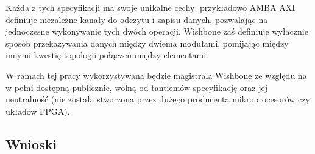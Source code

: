 Każda z tych specyfikacji ma swoje unikalne cechy: przykładowo AMBA AXI definiuje niezależne kanały do odczytu i zapisu danych, pozwalając na jednoczesne wykonywanie tych dwóch operacji. Wishbone zaś definiuje wyłącznie sposób przekazywania danych między dwiema modułami, pomijając między innymi kwestię topologii połączeń między elementami.

W ramach tej pracy wykorzystywana będzie magistrala Wishbone ze względu na w pełni dostępną publicznie, wolną od tantiemów specyfikację oraz jej neutralność (nie została stworzona przez dużego producenta mikroprocesorów czy układów FPGA).



\subsection{Wnioski}

